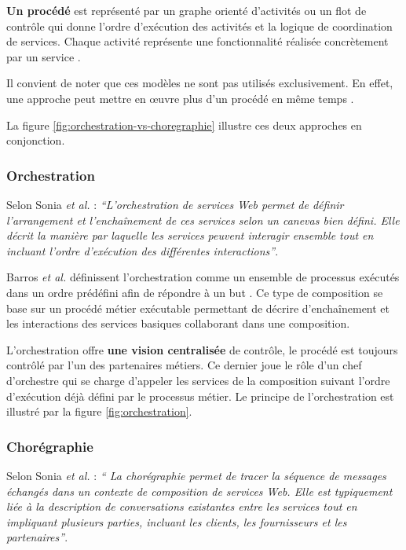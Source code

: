   \textbf{Un procédé} est représenté par un graphe orienté d'activités
  ou un flot de contrôle qui donne l'ordre d'exécution des activités
  et la logique de coordination de services. Chaque activité
  représente une fonctionnalité réalisée concrètement par un service
  \cite{chollet2009orchestration}.\medskip

  Il convient de noter que ces modèles ne sont pas utilisés
  exclusivement. En effet, une approche peut mettre en œuvre plus d'un
  procédé en même temps \cite{baryannis2010}.\medskip

  \newpage
  La figure \ref{fig:orchestration-vs-choregraphie} illustre ces deux
  approches en conjonction.

  

    \subsubsection{Orchestration}
    \label{sec:orchestration}
    Selon Sonia \emph{et al.} \cite{jamal2005environnement}:
    \emph{``L'orchestration de services Web permet de définir
      l'arrangement et l'enchaînement de ces services selon un
      canevas bien défini. Elle décrit la manière par laquelle les
      services peuvent interagir ensemble tout en incluant l'ordre
      d'exécution des différentes interactions''}.\bigskip

    Barros \emph{et al.} \cite{barros2006standards} définissent
    l'orchestration comme un ensemble de processus exécutés dans un
    ordre prédéfini afin de répondre à un but
    \cite{lopez2008selection}. Ce type de composition se base sur un
    procédé métier exécutable permettant de décrire d'enchaînement et
    les interactions des services basiques collaborant dans une
    composition.\medskip

    L'orchestration offre \textbf{une vision centralisée} de contrôle,
    le procédé est toujours contrôlé par l'un des partenaires
    métiers. Ce dernier joue le rôle d'un chef d'orchestre qui se
    charge d'appeler les services de la composition suivant l'ordre
    d'exécution déjà défini par le processus métier. Le principe de
    l'orchestration est illustré par la figure
    \ref{fig:orchestration}.

    \subsubsection{Chorégraphie}
    \label{sec:choregraphie-sec}
    Selon Sonia \emph{et al.} \cite{jamal2005environnement} : \emph{``
      La chorégraphie permet de tracer la séquence de messages
      échangés dans un contexte de composition de services Web. Elle
      est typiquement liée à la description de conversations
      existantes entre les services tout en impliquant plusieurs
      parties, incluant les clients, les fournisseurs et les
      partenaires''}.\medskip

